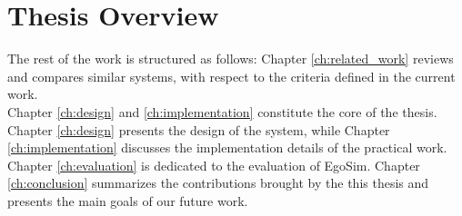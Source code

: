 \section{Thesis Overview} %
\label{sub:thesis_overview}

The rest of the work is structured as follows: Chapter \ref{ch:related_work} reviews and compares
similar systems, with respect to the criteria defined in the current work.\\

Chapter \ref{ch:design} and \ref{ch:implementation} constitute the core of the thesis. Chapter \ref{ch:design} presents the design of the system, while Chapter \ref{ch:implementation} discusses the implementation details of the practical work.\\

Chapter \ref{ch:evaluation} is dedicated to the evaluation of EgoSim. Chapter \ref{ch:conclusion} summarizes the contributions brought by the this thesis and presents the main goals of our future work.

